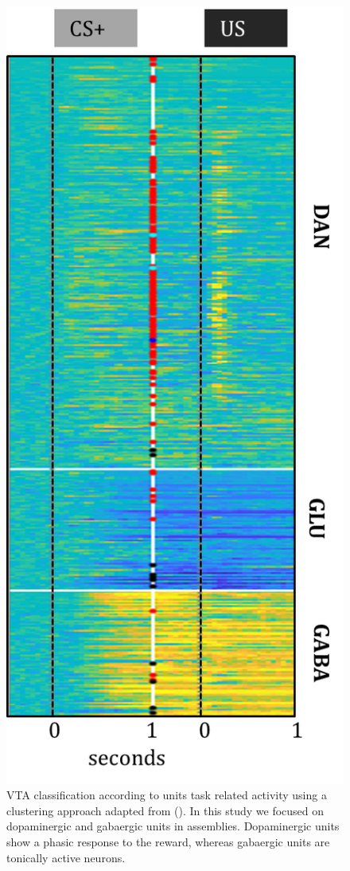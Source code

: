 \begin{figure}
  \centering
    \includegraphics[scale=0.75]{figures/ClassificationUnits.png}
   \caption{VTA classification according to units task related activity using a clustering approach adapted from (\cite{Uchida}). In this study we focused on dopaminergic and gabaergic units in assemblies. Dopaminergic units show a phasic response to the reward, whereas gabaergic units are tonically active neurons.}
    \label{fig:ClassificatonVTA}
\end{figure}

